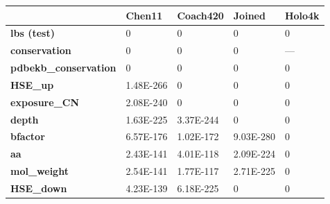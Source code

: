 \begin{table}[]
\centering
\begin{tabular}{lllll}
\hline
\textbf{}                     & \textbf{Chen11}                & \textbf{Coach420}               & \textbf{Joined}                & \textbf{Holo4k}                 \\ \hline
\textbf{lbs (test)}                  & 0                              & 0                               & 0                              & 0                               \\
\textbf{conservation}         & 0                              & 0                               & 0                              & ---                             \\
\textbf{pdbekb\_conservation} & 0                              & 0                               & 0                              & 0                               \\
\textbf{HSE\_up}              & 1.48E-266                      & 0                               & 0                              & 0                               \\
\textbf{exposure\_CN}         & 2.08E-240                      & 0                               & 0                              & 0                               \\
\textbf{depth}                & 1.63E-225                      & 3.37E-244                       & 0                              & 0                               \\
\textbf{bfactor}              & 6.57E-176                      & 1.02E-172                       & 9.03E-280                      & 0                               \\
\textbf{aa}                   & 2.43E-141                      & 4.01E-118                       & 2.09E-224                      & 0                               \\
\textbf{mol\_weight}          & 2.54E-141                      & 1.77E-117                       & 2.71E-225                      & 0                               \\
\textbf{HSE\_down}            & 4.23E-139                      & 6.18E-225                       & 0                              & 0                               \\

\end{tabular}
\end{table}
